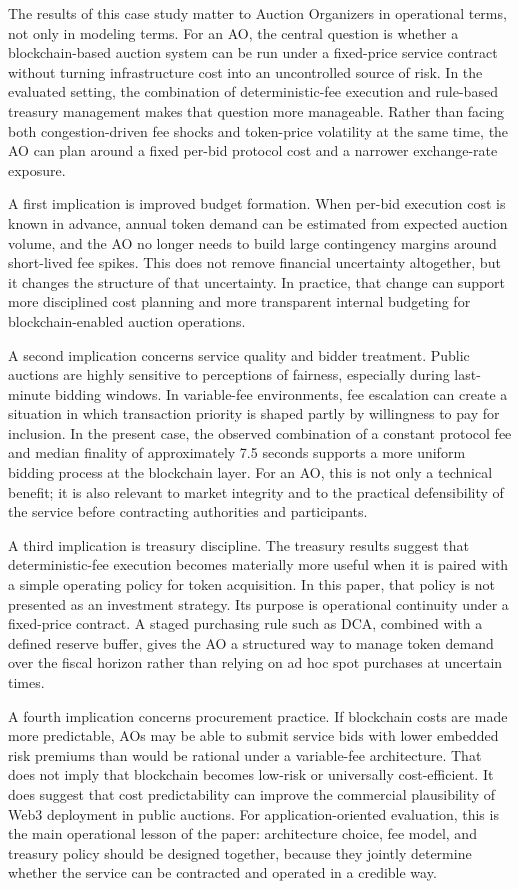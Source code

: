 \documentclass[runningheads]{llncs}
\begin{document}
The results of this case study matter to Auction Organizers in operational terms,
not only in modeling terms. For an AO, the central question is whether a
blockchain-based auction system can be run under a fixed-price service contract
without turning infrastructure cost into an uncontrolled source of risk. In the
evaluated setting, the combination of deterministic-fee execution and rule-based
treasury management makes that question more manageable. Rather than facing
both congestion-driven fee shocks and token-price volatility at the same time,
the AO can plan around a fixed per-bid protocol cost and a narrower exchange-rate
exposure.

A first implication is improved budget formation. When per-bid execution cost is
known in advance, annual token demand can be estimated from expected auction
volume, and the AO no longer needs to build large contingency margins around
short-lived fee spikes. This does not remove financial uncertainty altogether, but
it changes the structure of that uncertainty. In practice, that change can support
more disciplined cost planning and more transparent internal budgeting for
blockchain-enabled auction operations.

A second implication concerns service quality and bidder treatment. Public
auctions are highly sensitive to perceptions of fairness, especially during
last-minute bidding windows. In variable-fee environments, fee escalation can
create a situation in which transaction priority is shaped partly by willingness
to pay for inclusion. In the present case, the observed combination of a constant
protocol fee and median finality of approximately 7.5 seconds supports a more
uniform bidding process at the blockchain layer. For an AO, this is not only a
technical benefit; it is also relevant to market integrity and to the practical
defensibility of the service before contracting authorities and participants.

A third implication is treasury discipline. The treasury results suggest that
deterministic-fee execution becomes materially more useful when it is paired with
a simple operating policy for token acquisition. In this paper, that policy is not
presented as an investment strategy. Its purpose is operational continuity under
a fixed-price contract. A staged purchasing rule such as DCA, combined with a
defined reserve buffer, gives the AO a structured way to manage token demand
over the fiscal horizon rather than relying on ad hoc spot purchases at uncertain
times.

A fourth implication concerns procurement practice. If blockchain costs are made
more predictable, AOs may be able to submit service bids with lower embedded
risk premiums than would be rational under a variable-fee architecture. That does
not imply that blockchain becomes low-risk or universally cost-efficient. It does
suggest that cost predictability can improve the commercial plausibility of Web3
deployment in public auctions. For application-oriented evaluation, this is the
main operational lesson of the paper: architecture choice, fee model, and treasury
policy should be designed together, because they jointly determine whether the
service can be contracted and operated in a credible way.
\end{document}
